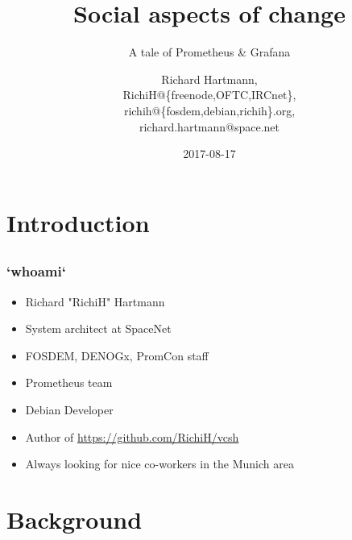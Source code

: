 \documentclass[t]{beamer}
\title{Social aspects of change}
\subtitle{A tale of Prometheus \& Grafana}
\author{Richard Hartmann,\\
RichiH@\{freenode,OFTC,IRCnet\},\\
richih@\{fosdem,debian,richih\}.org,\\
richard.hartmann@space.net}
\date{2017-08-17}
\begin{document}
\setcounter{tocdepth}{1}

\section{Introduction}

\subsection{}

\begin{frame}
	\titlepage
\end{frame}


\subsection{}

\begin{frame}
	\frametitle{`whoami`}
	\begin{itemize}
		\item Richard "RichiH" Hartmann
		\item System architect at SpaceNet
		\item FOSDEM, DENOGx, PromCon staff
		\item Prometheus team
		\item Debian Developer
		\item Author of \url{https://github.com/RichiH/vcsh}
		\item Always looking for nice co-workers in the Munich area
	\end{itemize}
\end{frame}


\section{Background}

\subsection{}
\end{document}
